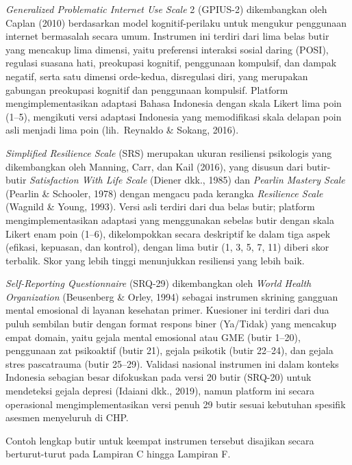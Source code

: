 \textit{Generalized Problematic Internet Use Scale} 2 (GPIUS-2) dikembangkan oleh Caplan (2010) berdasarkan model kognitif-perilaku untuk mengukur penggunaan internet bermasalah secara umum. Instrumen ini terdiri dari lima belas butir yang mencakup lima dimensi, yaitu preferensi interaksi sosial daring (POSI), regulasi suasana hati, preokupasi kognitif, penggunaan kompulsif, dan dampak negatif, serta satu dimensi orde-kedua, disregulasi diri, yang merupakan gabungan preokupasi kognitif dan penggunaan kompulsif. Platform mengimplementasikan adaptasi Bahasa Indonesia dengan skala Likert lima poin (1--5), mengikuti versi adaptasi Indonesia yang memodifikasi skala delapan poin asli menjadi lima poin (lih.\ Reynaldo \& Sokang, 2016).

\textit{Simplified Resilience Scale} (SRS) merupakan ukuran resiliensi psikologis yang dikembangkan oleh Manning, Carr, dan Kail (2016), yang disusun dari butir-butir \textit{Satisfaction With Life Scale} (Diener dkk., 1985) dan \textit{Pearlin Mastery Scale} (Pearlin \& Schooler, 1978) dengan mengacu pada kerangka \textit{Resilience Scale} (Wagnild \& Young, 1993). Versi asli terdiri dari dua belas butir; platform mengimplementasikan adaptasi yang menggunakan sebelas butir dengan skala Likert enam poin (1--6), dikelompokkan secara deskriptif ke dalam tiga aspek (efikasi, kepuasan, dan kontrol), dengan lima butir (1, 3, 5, 7, 11) diberi skor terbalik. Skor yang lebih tinggi menunjukkan resiliensi yang lebih baik.

\textit{Self-Reporting Questionnaire} (SRQ-29) dikembangkan oleh \textit{World Health Organization} (Beusenberg \& Orley, 1994) sebagai instrumen skrining gangguan mental emosional di layanan kesehatan primer. Kuesioner ini terdiri dari dua puluh sembilan butir dengan format respons biner (Ya/Tidak) yang mencakup empat domain, yaitu gejala mental emosional atau GME (butir 1--20), penggunaan zat psikoaktif (butir 21), gejala psikotik (butir 22--24), dan gejala stres pascatrauma (butir 25--29). Validasi nasional instrumen ini dalam konteks Indonesia sebagian besar difokuskan pada versi 20 butir (SRQ-20) untuk mendeteksi gejala depresi (Idaiani dkk., 2019), namun platform ini secara operasional mengimplementasikan versi penuh 29 butir sesuai kebutuhan spesifik asesmen menyeluruh di CHP.

Contoh lengkap butir untuk keempat instrumen tersebut disajikan secara berturut-turut pada Lampiran C hingga Lampiran F.

